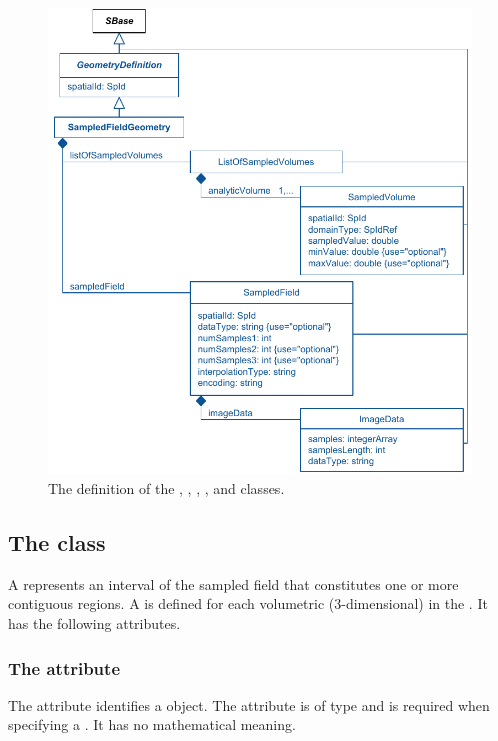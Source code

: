 \begin{figure}[ht]
  \includegraphics{figs/SampledFieldGeometry-uml}
  \caption{The definition of the \SampledFieldGeometry, \ListOfSampledVolumes, \SampledVolume, \SampledField, and \ImageData classes.}
  \label{SampledFieldGeometry-uml}
  \label{ListOfSampledVolumes-uml}
  \label{SampledVolume-uml}
  \label{SampledField-uml}
  \label{ImageData-uml}
\end{figure}



\subsection{The  class}
\label{SampledVolume-class}
A \SampledVolume represents an interval of the sampled field that constitutes one or more contiguous regions. A \SampledVolume is defined for each volumetric (3-dimensional) \Domain in the \Geometry. It has the following attributes.

\subsubsection{The  attribute}
The  attribute identifies a \SampledVolume object. The attribute is of type  and is required when specifying a \SampledVolume.  It has no mathematical meaning.

